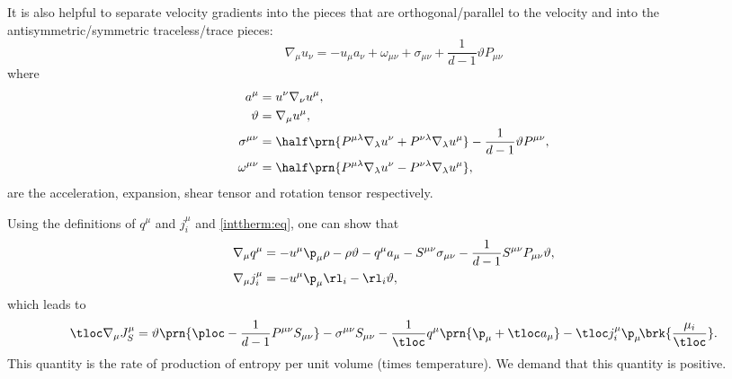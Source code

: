 It is also helpful to separate velocity gradients into the pieces that are orthogonal/parallel to the velocity and into the antisymmetric/symmetric traceless/trace pieces:
%
\begin{equation}\label{gradvel:eq}
  \nabla_\mu u_\nu = -u_\mu a_\nu + \omega_{\mu\nu} + \sigma_{\mu\nu} + \frac{1}{d-1}\vartheta P_{\mu\nu}
\end{equation}
%
where
%
\begin{equation}\label{fluidtensors:eq}
\begin{split}
  a^\mu &= u^\nu \nabla_\nu u^\mu, \\
  \vartheta &= \nabla_\mu u^\mu, \\
  \sigma^{\mu\nu} &= \half \prn{P^{\mu\lambda} \nabla_\lambda u^\nu
                   + P^{\nu\lambda} \nabla_\lambda u^\mu}
                   - \frac{1}{d-1} \vartheta P^{\mu\nu}, \\
  \omega^{\mu\nu} &= \half \prn{P^{\mu\lambda} \nabla_\lambda u^\nu
                   - P^{\nu\lambda} \nabla_\lambda u^\mu}, \\
\end{split}
\end{equation}
%
are the acceleration, expansion, shear tensor and rotation tensor respectively.

Using the definitions of $q^\mu$ and $j^\mu_i$ and \eqref{inttherm:eq}, one can show that
%
\begin{equation*}
\begin{split}
  \nabla_\mu q^\mu &= -u^\mu\p_\mu\rho - \rho\vartheta - q^\mu a_\mu
                      - S^{\mu\nu}\sigma_{\mu\nu}
                      - \frac{1}{d-1}S^{\mu\nu}P_{\mu\nu}\vartheta, \\
  \nabla_\mu j^\mu_i &= -u^\mu\p_\mu\rl_i - \rl_i\vartheta,
\end{split}
\end{equation*}
%
which leads to
%
\begin{equation}\label{divent:eq}
  \tloc \nabla_\mu J^\mu_S =
    \vartheta\prn{\ploc - \frac{1}{d-1}P^{\mu\nu}S_{\mu\nu}}
    - \sigma^{\mu\nu} S_{\mu\nu}
    - \frac{1}{\tloc} q^\mu \prn{\p_\mu + \tloc a_\mu}
    - \tloc j^\mu_i \p_\mu\!\brk{\frac{\mu_i}{\tloc}}.
\end{equation}
%
This quantity is the rate of production of entropy per unit volume (times temperature). We demand that this quantity is positive.

